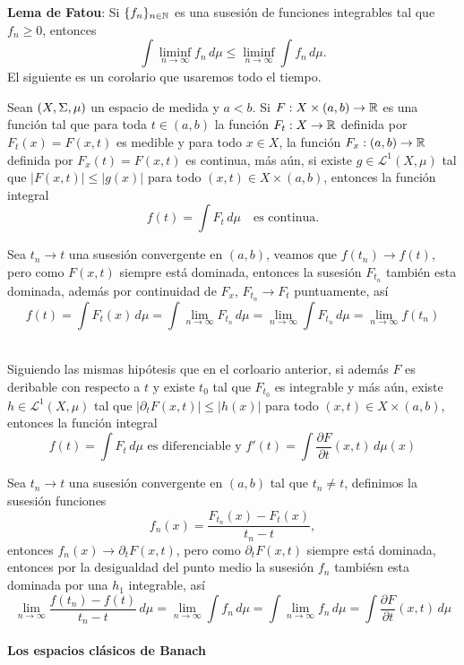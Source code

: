 \documentclass[main.tex]{subfiles}
\begin{document}
\exe\textbf{Lema de Fatou}: Si $\{f_n\}_{n\in \mathbb N }$ es una susesión de funciones integrables tal que $f_n \geq 0$, entonces
\[
\int \liminf_{n \to \infty} f_n \, d\mu \leq \liminf_{n \to \infty} \int f_n \, d\mu.
\]
El siguiente es un corolario que usaremos todo el tiempo.
\begin{cor}
  Sean $(X,\Sigma,\mu)$ un espacio de medida y $a<b$. Si $F:X\times(a,b)\to\mathbb R $ es una función tal que para toda $t\in(a,b)$ la función $F_t:X\to\mathbb R $ definida por $F_t(x)=F(x,t)$ es medible y para todo $x\in X$, la función $F_x:(a,b)\to\mathbb R $ definida por $F_x(t)=F(x,t)$ es continua, más aún, si existe $g\in\mathcal{L}^1(X,\mu)$ tal que $|F(x,t)|\leq|g(x)|$ para todo $(x,t)\in X\times(a,b)$, entonces la función integral
\begin{equation}
  f(t)=\int F_t\,d\mu\quad\text{es continua.}
  \end{equation}
\end{cor}
\dem Sea $t_n\to t$ una susesión convergente en $(a,b)$, veamos que $f(t_n)\to f(t)$, pero como $F(x,t)$ siempre está dominada, entonces la susesión $F_{t_n}$ también esta dominada, además por continuidad de $F_x$, $F_{t_n}\to F_t$ puntuamente, así
\[
f(t)=\int F_t(x)\,d\mu=\int\lim_{n\to\infty}F_{t_n}\,d\mu=\lim_{n\to\infty}\int F_{t_n}\,d\mu=\lim_{n\to\infty}f(t_n)
\]
\QED\\
\begin{cor}
Siguiendo las mismas hipótesis que en el corloario anterior, si además $F$ es deribable con respecto a $t$ y existe $t_0$ tal que $F_{t_0}$ es integrable y más aún, existe $h\in\mathcal{L}^1(X,\mu)$ tal que $|\partial_t F(x,t)|\leq|h(x)|$ para todo $(x,t)\in X\times(a,b)$, entonces la función integral
\begin{equation}
  f(t)=\int F_t\,d\mu\text{ es diferenciable y } f'(t)=\int \dfrac{\partial F}{\partial t}(x,t)\,d\mu(x)
  \end{equation}
\end{cor}\label{dom-dif}
\dem Sea $t_n\to t$ una susesión convergente en $(a,b)$ tal que $t_n\neq t$, definimos la susesión funciones
\[
f_n(x)=\frac{F_{t_n}(x)-F_t(x)}{t_n-t},
\]
entonces $f_n(x)\to\partial_tF(x,t)$, pero como $\partial_t F(x,t)$ siempre está dominada, entonces por la desigualdad del punto medio la susesión $f_{n}$ tambiésn esta dominada por una $h_1$ integrable, así
\[
\lim_{n\to\infty}\frac{f(t_n)-f(t)}{t_n-t}\,d\mu=\lim_{n\to\infty}\int f_{n}\,d\mu=\int\lim_{n\to\infty}f_{n}\,d\mu=\int \dfrac{\partial F}{\partial t}(x,t)\,d\mu
\]
\QED\\
\noindent\textbf{Los espacios clásicos de Banach}
\end{document}
